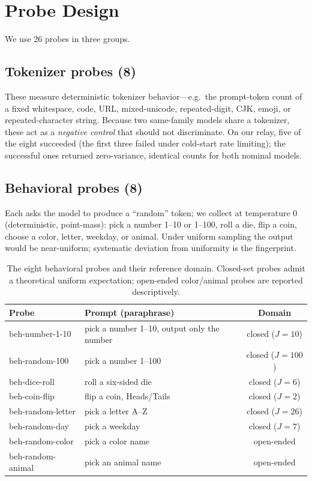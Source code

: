 \documentclass[11pt]{article}
\begin{document}
\section{Probe Design}
\label{sec:probes}

We use 26 probes in three groups.

\subsection{Tokenizer probes (8)}
These measure deterministic tokenizer behavior---e.g.\ the prompt-token count of a fixed whitespace, code, URL, mixed-unicode, repeated-digit, CJK, emoji, or repeated-character string. Because two same-family models share a tokenizer, these act as a \emph{negative control} that should not discriminate. On our relay, five of the eight succeeded (the first three failed under cold-start rate limiting); the successful ones returned zero-variance, identical counts for both nominal models.

\subsection{Behavioral probes (8)}
Each asks the model to produce a ``random'' token; we collect at temperature 0 (deterministic, point-mass): pick a number 1--10 or 1--100, roll a die, flip a coin, choose a color, letter, weekday, or animal. Under uniform sampling the output would be near-uniform; systematic deviation from uniformity is the fingerprint.

\begin{table}[h]
\centering
\small
\begin{tabular}{llc}
\toprule
Probe & Prompt (paraphrase) & Domain \\
\midrule
beh-number-1-10 & pick a number 1--10, output only the number & closed ($J{=}10$) \\
beh-random-100 & pick a number 1--100 & closed ($J{=}100$) \\
beh-dice-roll & roll a six-sided die & closed ($J{=}6$) \\
beh-coin-flip & flip a coin, Heads/Tails & closed ($J{=}2$) \\
beh-random-letter & pick a letter A--Z & closed ($J{=}26$) \\
beh-random-day & pick a weekday & closed ($J{=}7$) \\
beh-random-color & pick a color name & open-ended \\
beh-random-animal & pick an animal name & open-ended \\
\bottomrule
\end{tabular}
\caption{The eight behavioral probes and their reference domain. Closed-set probes admit a theoretical uniform expectation; open-ended color/animal probes are reported descriptively.}
\end{table}
\end{document}
